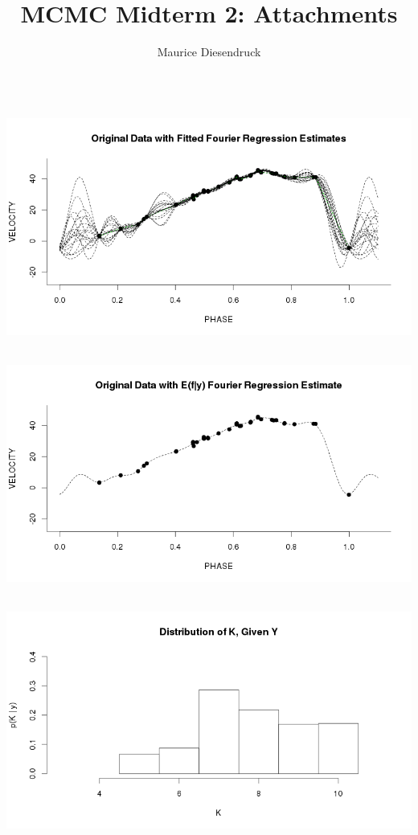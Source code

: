 \documentclass[12pt,letterpaper]{article}\usepackage[]{graphicx}\usepackage[]{color}
\author{Maurice Diesendruck}
\title{MCMC Midterm 2: Attachments}
\begin{document}
\maketitle

\begin{center}
\includegraphics[height=8cm, keepaspectratio]{origdatawithfits.png}\\
\includegraphics[height=8cm, keepaspectratio]{expected-f.png}\\
\includegraphics[height=8cm, keepaspectratio]{distribution-K.png}\\

\end{center}
\end{document}
